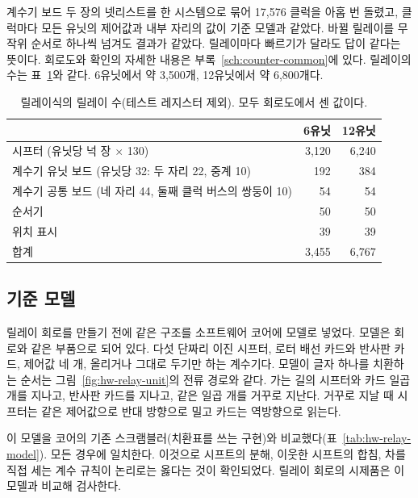 계수기 보드 두 장의 넷리스트를 한 시스템으로 묶어 17,576 클럭을 아홉 번 돌렸고, 클럭마다 모든 유닛의 제어값과
내부 자리의 값이 기준 모델과 같았다. 바뀔 릴레이를 무작위 순서로 하나씩 넘겨도 결과가 같았다. 릴레이마다 빠르기가
달라도 답이 같다는 뜻이다. 회로도와 확인의 자세한 내용은 부록~\ref{sch:counter-common}에 있다. 릴레이의 수는
표~\ref{tab:hw-relay-count}와 같다. 6유닛에서 약 3,500개, 12유닛에서 약 6,800개다.

\begin{table}[ht]
\centering
\caption{릴레이식의 릴레이 수(테스트 레지스터 제외). 모두 회로도에서 센 값이다.}
\label{tab:hw-relay-count}
\small
\begin{tabular}{lrr}
\toprule
 & 6유닛 & 12유닛 \\
\midrule
시프터 (유닛당 넉 장 $\times$ 130) & 3,120 & 6,240 \\
계수기 유닛 보드 (유닛당 32: 두 자리 22, 중계 10) & 192 & 384 \\
계수기 공통 보드 (네 자리 44, 둘째 클럭 버스의 쌍둥이 10) & 54 & 54 \\
순서기 & 50 & 50 \\
위치 표시 & 39 & 39 \\
\midrule
합계 & 3,455 & 6,767 \\
\bottomrule
\end{tabular}
\end{table}

\subsection{기준 모델}\label{sec:hw-relay-model}

릴레이 회로를 만들기 전에 같은 구조를 소프트웨어 코어에 모델로 넣었다. 모델은 회로와 같은 부품으로 되어
있다. 다섯 단짜리 이진 시프터, 로터 배선 카드와 반사판 카드, 제어값 네 개, 올리거나 그대로 두기만 하는
계수기다. 모델이 글자 하나를 치환하는 순서는 그림~\ref{fig:hw-relay-unit}의 전류 경로와 같다. 가는 길의
시프터와 카드 일곱 개를 지나고, 반사판 카드를 지나고, 같은 일곱 개를 거꾸로 지난다. 거꾸로 지날 때 시프터는
같은 제어값으로 반대 방향으로 밀고 카드는 역방향으로 읽는다.

이 모델을 코어의 기존 스크램블러(치환표를 쓰는 구현)와 비교했다(표~\ref{tab:hw-relay-model}). 모든 경우에
일치한다. 이것으로 시프트의 분해, 이웃한 시프트의 합침, 차를 직접 세는 계수 규칙이 논리로는 옳다는 것이
확인되었다. 릴레이 회로의 시제품은 이 모델과 비교해 검사한다.

